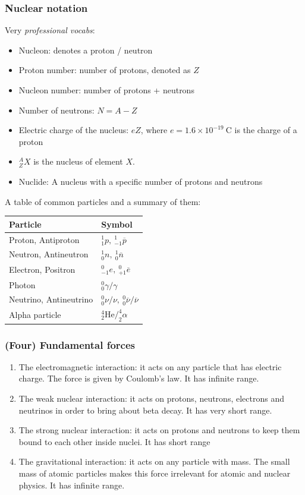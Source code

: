 \documentclass[a4paper,12pt]{article}
\begin{document}
\subsubsection*{Nuclear notation}
Very \textit{professional vocabs}:
\begin{itemize}
  \item Nucleon: denotes a proton / neutron
  \item Proton number: number of protons, denoted as $Z$
  \item Nucleon number: number of protons + neutrons
  \item Number of neutrons: $N=A-Z$
  \item Electric charge of the nucleus: $eZ$, where $e=1.6\times 10^{-19}\ \text{C}$ is the charge of a proton
  \item $^A_ZX$ is the nucleus of element $X$.
  \item Nuclide: A nucleus with a specific number of protons and neutrons
\end{itemize}
A table of common particles and a summary of them:
\begin{center}
\begin{tabularx}{\textwidth}{@{}|Y | Y|@{}}
\toprule
\textbf{Particle} & \textbf{Symbol} \\
\midrule 
Proton, Antiproton & $^1_1p,\ ^1_{-1}\overline{p}$\\
\midrule
Neutron, Antineutron & $^1_0n,\ ^1_0\overline{n}$\\
\midrule
Electron, Positron & $^0_{-1}e,\ ^0_{+1}\overline{e}$\\
\midrule
Photon & $^0_0\gamma/\gamma$ \\
\midrule
Neutrino, Antineutrino & $^0_0\nu/\nu,\ ^0_0\overline{\nu}/\overline{\nu}$ \\
\midrule
Alpha particle & $^4_2\text{He}/^4_2\alpha$ \\
\bottomrule 
\end{tabularx}
\end{center}
\subsubsection*{(Four) Fundamental forces}
\begin{enumerate}
  \item The electromagnetic interaction: it acts on any particle that has electric charge. The force is given by Coulomb's law. It has infinite range.
  \item The weak nuclear interaction: it acts on protons, neutrons, electrons and neutrinos in order to bring about beta decay. It has very short range.
  \item The strong nuclear interaction: it acts on protons and neutrons to keep them bound to each other inside nuclei. It has short range
  \item The gravitational interaction: it acts on any particle with mass. The small mass of atomic particles makes this force irrelevant for atomic and nuclear physics. It has infinite range.
\end{enumerate}
\end{document}
